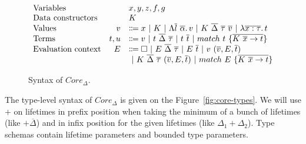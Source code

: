 \documentclass[11pt]{article}
\newcommand{\vor}{~|~}
\newcommand{\ap}{~}
\begin{document}
    \begin{figure}
        \centering
        \[
            \begin{array}{lrl}
                \text{Variables}          &   & x, y, z, f, g                                                                                                                          \\
                \text{Data constructors}  &   & K                                                                                                                                      \\
                \text{Values} & v & \Coloneqq x \vor K \vor \Lambda \overline{l}~\overline{\alpha} \ldotp v \vor K\ap\overline{\Delta}\ap \overline{\tau} \ap \overline{v} \vor \lambda \overline{x : \tau}\ldotp t
                \\
                \text{Terms} & t, u & \Coloneqq v \vor t\ap\overline{\Delta}\ap\overline{\tau} \vor t\ap \overline{t} \vor match ~ t ~\{\overline{K \ap \overline{x} \to t}\}
                \\
                \text{Evaluation context} & E & \Coloneqq \square \vor E \ap\overline{\Delta}\ap \overline{\tau} \vor E \ap \overline{t} \vor v \ap (\overline{v}, E, \overline{t})    \\
                &   & \vor K\ap\overline{\Delta}\ap\overline{\tau}\ap(\overline{v}, E, \overline{t}) \vor match\ap E\ap \{\overline{K\ap\overline{x}\to t}\}
            \end{array}
        \]
        \caption{Syntax of $Core_\Delta$.}
        \label{fig:core-syntax}
    \end{figure}

    The type-level syntax of $Core_\Delta$ is given on the Figure\ \ref{fig:core-types}.
    We will use $+$ on lifetimes in prefix position when taking the minimum of a bunch of lifetimes (like $+\overline{\Delta}$) and in infix position for the given lifetimes (like $\Delta_1 + \Delta_2$).
    Type schemas contain lifetime parameters and bounded type parameters.
\end{document}
